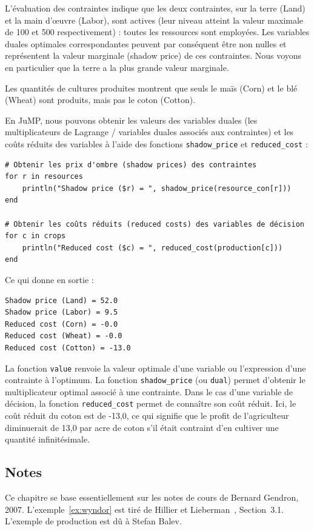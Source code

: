\begin{example}
L'évaluation des contraintes indique que les deux contraintes, sur la terre (Land) et la main d'œuvre (Labor), sont actives (leur niveau atteint la valeur maximale de 100 et 500 respectivement) : toutes les ressources sont employées.
Les variables duales optimales correspondantes peuvent par conséquent être non nulles et représentent la valeur marginale (shadow price) de ces contraintes.
Nous voyons en particulier que la terre a la plus grande valeur marginale.

Les quantités de cultures produites montrent que seuls le maïs (Corn) et le blé (Wheat) sont produits, mais pas le coton (Cotton).

En JuMP, nous pouvons obtenir les valeurs des variables duales (les multiplicateurs de Lagrange / variables duales associés aux contraintes) et les coûts réduits des variables à l'aide des fonctions \verb|shadow_price| et \verb|reduced_cost| :
\begin{verbatim}
# Obtenir les prix d'ombre (shadow prices) des contraintes
for r in resources
    println("Shadow price ($r) = ", shadow_price(resource_con[r]))
end

# Obtenir les coûts réduits (reduced costs) des variables de décision
for c in crops
    println("Reduced cost ($c) = ", reduced_cost(production[c]))
end
\end{verbatim}
Ce qui donne en sortie :
\begin{verbatim}
Shadow price (Land) = 52.0
Shadow price (Labor) = 9.5
Reduced cost (Corn) = -0.0
Reduced cost (Wheat) = -0.0
Reduced cost (Cotton) = -13.0
\end{verbatim}
La fonction \verb|value| renvoie la valeur optimale d'une variable ou l'expression d'une contrainte à l'optimum.
La fonction \verb|shadow_price| (ou \verb|dual|) permet d'obtenir le multiplicateur optimal associé à une contrainte.
Dans le cas d'une variable de décision, la fonction \verb|reduced_cost| permet de connaître son coût réduit. Ici, le coût réduit du coton est de -13,0, ce qui signifie que le profit de l'agriculteur diminuerait de 13,0 par acre de coton s'il était contraint d'en cultiver une quantité infinitésimale.
\end{example}

\begin{small}
\section{Notes}

Ce chapitre se base essentiellement sur les notes de cours de Bernard Gendron, 2007.
L'exemple~\ref{ex:wyndor} est tiré de Hillier et Lieberman~\cite{HillLieb01}, Section~3.1.
L'exemple de production est dû à Stefan Balev.

\end{small}
